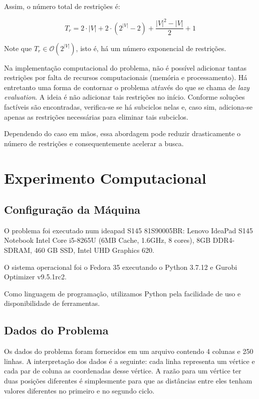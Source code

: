 \documentclass{article}
\newcommand{\abs}[1]{\ensuremath{\left| #1 \right|}}
\newcommand{\vertices}{\ensuremath{V}}
\newcommand{\nvertices}{\ensuremath{\abs{\vertices}}}
\newcommand{\totalconstraints}{\ensuremath{T_r}}
\newcommand{\bigo}[1]{\ensuremath{\mathcal{O}\left( #1 \right)}}
\begin{document}
Assim, o número total de restrições é:

\begin{equation}
	\totalconstraints =
		  2 \cdot \abs{\vertices}
		+ 2 \cdot \left( 2^{\abs{\vertices}} - 2\right)
		+ \dfrac{\abs{\vertices}^2 - \abs{\vertices}}{2}
		+ 1
\end{equation}

Note que $\totalconstraints \in \bigo{2^{\nvertices}}$, isto é, há um número exponencial de restrições.

Na implementação computacional do problema, não é possível adicionar tantas restrições por falta de recursos computacionais (memória e processamento). Há entretanto uma forma de contornar o problema atŕavés do que se chama de \textit{lazy evaluation}. A ideia é não adicionar tais restrições no início. Conforme soluções factíveis são encontradas, verifica-se se há subciclos nelas e, caso sim, adiciona-se apenas as restrições necessárias para eliminar tais subciclos.

Dependendo do caso em mãos, essa abordagem pode reduzir drasticamente o número de restrições e consequentemente acelerar a busca.


\section{Experimento Computacional}

\subsection{Configuração da Máquina}

O problema foi executado num ideapad S145 81S90005BR: Lenovo IdeaPad S145 Notebook Intel Core i5-8265U (6MB Cache, 1.6GHz, 8 cores), 8GB DDR4-SDRAM, 460 GB SSD, Intel UHD Graphics 620.

O sistema operacional foi o Fedora 35 executando o Python 3.7.12 e Gurobi Optimizer v9.5.1rc2\cite{gurobi}.

Como linguagem de programação, utilizamos Python\cite{python3} pela facilidade de uso e disponibilidade de ferramentas.


\subsection{Dados do Problema}

Os dados do problema foram fornecidos em um arquivo contendo 4 colunas e 250 linhas. A interpretação dos dados é a seguinte: cada linha representa um vértice e cada par de coluna as coordenadas desse vértice. A razão para um vértice ter duas posições diferentes é simplesmente para que as distâncias entre eles tenham valores diferentes no primeiro e no segundo ciclo.
\end{document}
